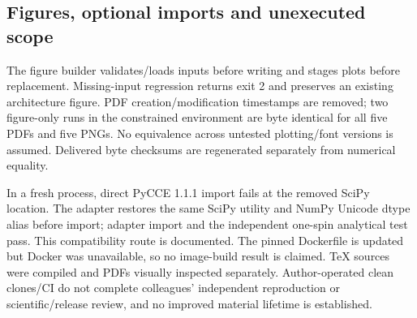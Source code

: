 \subsection{Figures, optional imports and unexecuted scope}
The figure builder validates/loads inputs before writing and stages plots before replacement. Missing-input regression returns exit 2 and preserves an existing architecture figure. PDF creation/modification timestamps are removed; two figure-only runs in the constrained environment are byte identical for all five PDFs and five PNGs. No equivalence across untested plotting/font versions is assumed. Delivered byte checksums are regenerated separately from numerical equality.

In a fresh process, direct PyCCE 1.1.1 import fails at the removed SciPy  location. The adapter restores the same SciPy utility and NumPy Unicode dtype alias before import; adapter import and the independent one-spin analytical test pass. This compatibility route is documented. The pinned Dockerfile is updated but Docker was unavailable, so no image-build result is claimed. TeX sources were compiled and PDFs visually inspected separately. Author-operated clean clones/CI do not complete colleagues' independent reproduction or scientific/release review, and no improved material lifetime is established.

